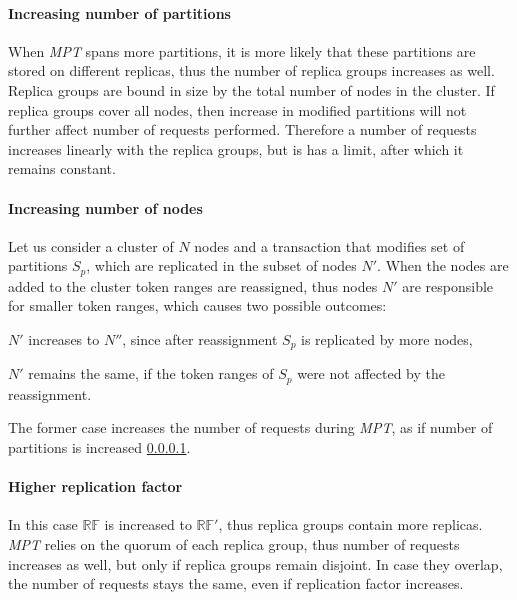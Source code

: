 \documentclass[runningheads,a4paper]{llncs}
\newcommand{\nodesTx}{$\mathit{N'}$\xspace}
\newcommand{\mpt}{\emph{MPT}\xspace}
\newcommand{\RFalone}{$\mathbb{RF}$\xspace}
\newcommand{\RFalonePrim}{$\mathbb{RF'}$\xspace}
\begin{document}
\paragraph{Increasing number of partitions}\label{sec:tests:perf:partitions}

When \mpt spans more partitions, it is more likely that these partitions are stored on different replicas, thus the number of replica groups increases as well. Replica groups are bound in size by the total number of nodes in the cluster. If replica groups cover all nodes, then increase in modified partitions will not further affect number of requests performed. Therefore a number of requests increases linearly with the replica groups, but is has a limit, after which it remains constant.

\paragraph{Increasing number of nodes}
Let us consider a cluster of $N$ nodes and a transaction that modifies set of partitions $S_{p}$, which are replicated in the subset of nodes \nodesTx. When the nodes are added to the cluster token ranges are reassigned, thus nodes $N'$ are responsible for smaller token ranges, which causes two possible outcomes:
\begin{enumerate*}[label=\alph*)]
\item \nodesTx increases to $N''$, since after reassignment $S_{p}$ is replicated by more nodes,
\item \nodesTx remains the same, if the token ranges of $S_{p}$ were not affected by the reassignment.
\end{enumerate*}

The former case increases the number of requests during \mpt, as if number of partitions is increased \ref{sec:tests:perf:partitions}.

\paragraph{Higher replication factor}
In this case \RFalone is increased to \RFalonePrim, thus replica groups contain more replicas. \mpt relies on the quorum of each replica group, thus number of requests increases as well, but only if replica groups remain disjoint. In case they overlap, the number of requests stays the same, even if replication factor increases.
\end{document}
